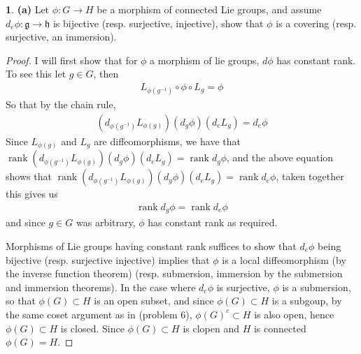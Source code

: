 \documentclass[10.5pt]{article}
\theoremstyle{definition}
\newtheorem{pb}{}
\newcommand{\spg}{\mathfrak{g}}
\newcommand{\sph}{\mathfrak{h}}
\begin{document}
    \begin{pb}
        \textbf{(a)} Let \(\phi: G \to H\) be a morphism of connected Lie groups, and assume \(d_e \phi: \spg \to \sph\) is bijective (resp. surjective, injective), show that \(\phi\) is a covering (resp. surjective, an immersion).

        \begin{proof}
            I will first show that for \(\phi\) a morphism of lie groups, \(d\phi\) has constant rank. To see this let \(g \in G\), then
            \begin{align*}
                L_{\phi(g^{-1})} \circ \phi \circ L_g = \phi
            \end{align*}
            So that by the chain rule,
            \begin{align*}
                (d_{\phi(g^{-1})}L_{\phi(g)})(d_g\phi)(d_eL_g) = d_e\phi
            \end{align*}
            Since \(L_{\phi(g)}\) and \(L_g\) are diffeomorphisms, we have that \(\operatorname{rank}(d_{\phi(g^{-1})}L_{\phi(g)})(d_g\phi)(d_eL_g) = \operatorname{rank} d_g\phi\), and the above equation shows that \(\operatorname{rank}(d_{\phi(g^{-1})}L_{\phi(g)})(d_g\phi)(d_eL_g) = \operatorname{rank}d_e\phi\), taken together this gives us
            \begin{align*}
                \operatorname{rank}d_g\phi = \operatorname{rank} d_e\phi
            \end{align*}
            and since \(g \in G\) was arbitrary, \(\phi\) has constant rank as required.

            Morphisms of Lie groups having constant rank suffices to show that \(d_e\phi\) being bijective (resp. surjective injective) implies that \(\phi\) is a local diffeomorphism (by the inverse function theorem) (resp. submersion, immersion by the submersion and immersion theorems). In the case where \(d_e\phi\) is surjective, \(\phi\) is a submersion, so that \(\phi(G) \subset H\) is an open subset, and since \(\phi(G) \subset H\) is a subgoup, by the same coset argument as in (problem 6), \(\phi(G)^c \subset H\) is also open, hence \(\phi(G) \subset H\) is closed. Since \(\phi(G) \subset H\) is clopen and \(H\) is connected \(\phi(G) = H\).
            

\end{proof}
\end{pb}
\end{document}
